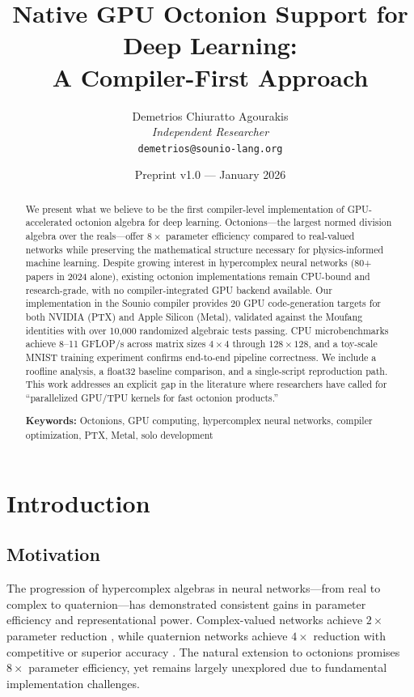 \documentclass[11pt,a4paper]{article}
\title{\textbf{Native GPU Octonion Support for Deep Learning:\\A Compiler-First Approach}}
\author{Demetrios Chiuratto Agourakis\\
\textit{Independent Researcher}\\
\texttt{demetrios@sounio-lang.org}}
\date{Preprint v1.0 --- January 2026}
\begin{document}
\maketitle

\begin{abstract}
We present what we believe to be the first compiler-level implementation of GPU-accelerated octonion algebra for deep learning. Octonions---the largest normed division algebra over the reals---offer $8\times$ parameter efficiency compared to real-valued networks while preserving the mathematical structure necessary for physics-informed machine learning. Despite growing interest in hypercomplex neural networks (80+ papers in 2024 alone), existing octonion implementations remain CPU-bound and research-grade, with no compiler-integrated GPU backend available. Our implementation in the Sounio compiler provides 20 GPU code-generation targets for both NVIDIA (PTX) and Apple Silicon (Metal), validated against the Moufang identities with over 10{,}000 randomized algebraic tests passing. CPU microbenchmarks achieve 8--11 GFLOP/s across matrix sizes $4 \times 4$ through $128 \times 128$, and a toy-scale MNIST training experiment confirms end-to-end pipeline correctness. We include a roofline analysis, a float32 baseline comparison, and a single-script reproduction path. This work addresses an explicit gap in the literature where researchers have called for ``parallelized GPU/TPU kernels for fast octonion products.''

\medskip
\noindent\textbf{Keywords:} Octonions, GPU computing, hypercomplex neural networks, compiler optimization, PTX, Metal, solo development
\end{abstract}

\section{Introduction}

\subsection{Motivation}

The progression of hypercomplex algebras in neural networks---from real to complex to quaternion---has demonstrated consistent gains in parameter efficiency and representational power. Complex-valued networks achieve $2\times$ parameter reduction \cite{trabelsi2017}, while quaternion networks achieve $4\times$ reduction with competitive or superior accuracy \cite{parcollet2019,gaudet2018}. The natural extension to octonions promises $8\times$ parameter efficiency, yet remains largely unexplored due to fundamental implementation challenges.
\end{document}
